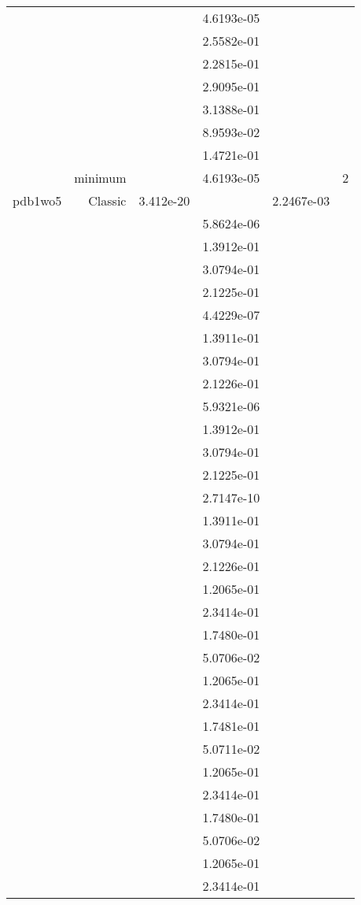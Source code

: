 \begin{xltabular}{\textwidth}{r|rS[table-format=1.3e+2]S[table-format=1.4e+2]S[table-format=1.4e+2]S[table-format=-1.5]}
&  &  & 4.6193e-05 & & \\
&  &  & 2.5582e-01 & & \\
&  &  & 2.2815e-01 & & \\
&  &  & 2.9095e-01 & & \\
&  &  & 3.1388e-01 & & \\
&  &  & 8.9593e-02 & & \\
&  &  & 1.4721e-01 & & \\
& minimum &  & 4.6193e-05 & & 2 \\  \addlinespace
pdb1wo5 & Classic & 3.412e-20 &  & 2.2467e-03 & \\
&  &  & 5.8624e-06 & & \\
&  &  & 1.3912e-01 & & \\
&  &  & 3.0794e-01 & & \\
&  &  & 2.1225e-01 & & \\
&  &  & 4.4229e-07 & & \\
&  &  & 1.3911e-01 & & \\
&  &  & 3.0794e-01 & & \\
&  &  & 2.1226e-01 & & \\
&  &  & 5.9321e-06 & & \\
&  &  & 1.3912e-01 & & \\
&  &  & 3.0794e-01 & & \\
&  &  & 2.1225e-01 & & \\
&  &  & 2.7147e-10 & & \\
&  &  & 1.3911e-01 & & \\
&  &  & 3.0794e-01 & & \\
&  &  & 2.1226e-01 & & \\
&  &  & 1.2065e-01 & & \\
&  &  & 2.3414e-01 & & \\
&  &  & 1.7480e-01 & & \\
&  &  & 5.0706e-02 & & \\
&  &  & 1.2065e-01 & & \\
&  &  & 2.3414e-01 & & \\
&  &  & 1.7481e-01 & & \\
&  &  & 5.0711e-02 & & \\
&  &  & 1.2065e-01 & & \\
&  &  & 2.3414e-01 & & \\
&  &  & 1.7480e-01 & & \\
&  &  & 5.0706e-02 & & \\
&  &  & 1.2065e-01 & & \\
&  &  & 2.3414e-01 & & \\

\end{xltabular}
